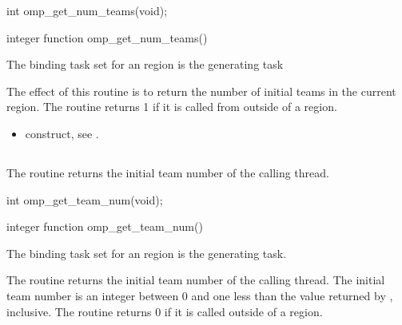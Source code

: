 \format
\begin{ccppspecific}
\begin{ompcFunction}
int omp_get_num_teams(void);
\end{ompcFunction}
\end{ccppspecific}

\begin{fortranspecific}
\begin{ompfFunction}
integer function omp_get_num_teams()
\end{ompfFunction}
\end{fortranspecific}

\binding
The binding task set for an  region is 
the generating task

\effect
The effect of this routine is to return the number of initial 
teams in the current  region. The routine returns 1 
if it is called from outside of a  region.

\crossreferences
\begin{itemize}
\item {} construct, see
.
\end{itemize}



\subsection{}
\label{subsec:omp_get_team_num}
\summary
The  routine returns the initial team 
number of the calling thread.

\format
\begin{ccppspecific}
\begin{ompcFunction}
int omp_get_team_num(void);
\end{ompcFunction}
\end{ccppspecific}

\begin{fortranspecific}
\begin{ompfFunction}
integer function omp_get_team_num()
\end{ompfFunction}
\end{fortranspecific}

\binding
The binding task set for an  region is the generating task.

\effect
The  routine returns the initial team number of the calling thread. The
initial team number is an integer between 0 and one less than the value returned by
, inclusive. The routine returns 0 if it is called outside of a
 region.

